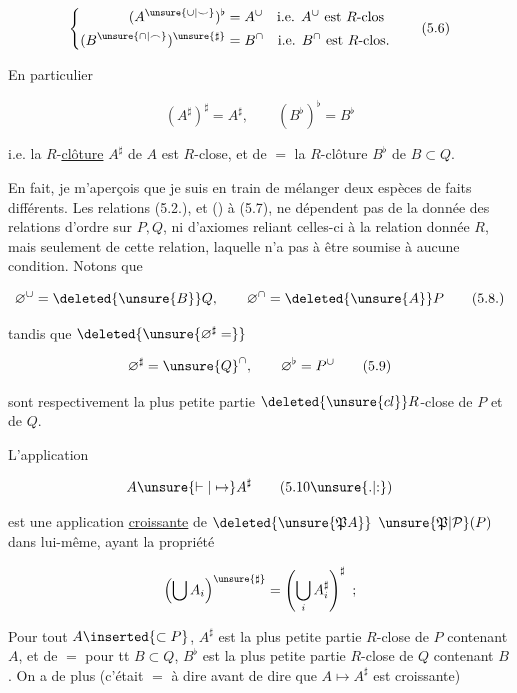 \[
\left\{\begin{aligned}
 (A^{\unsure{\cup|\smile}})^\flat&=A^\cup\quad\text{i.e. }A^\cup\text{ est }R\text{-clos}\\
 (B^{\unsure{\cap|\frown}})^{\unsure{\sharp}}&=B^\cap\quad\text{i.e. }B^\cap\text{ est }R\text{-clos.}
\end{aligned}\right.
\tag*{(5.6)}
\]

En particulier

\[
 (A^\sharp)^\sharp=A^\sharp,\qquad (B^\flat)^\flat=B^\flat
\tag*{(5.7.)}
\]

i.e. la $R$-\uline{clôture} $A^\sharp$ de $A$  est $R$-close, et de $=$ la $R$-clôture $B^\flat$ de $B\subset Q$.

En fait, je m'aperçois que je suis en train de mélanger deux espèces de faits différents.  Les relations (5.2.), et () à (5.7), ne dépendent pas de la donnée des relations d'ordre sur $P,Q$, ni d'axiomes reliant celles-ci à la relation donnée $R$, mais seulement de cette relation, laquelle n'a pas à être soumise à aucune condition. Notons que

\[
 \varnothing^\cup=\deleted{\unsure{B}}Q,\qquad \varnothing^\cap=\deleted{\unsure{A}}P
 \tag*{(5.8.)}
\]

tandis que $\deleted{\unsure{\varnothing^\sharp=}}$

\[
 \varnothing^\sharp=\unsure{Q}^\cap,\qquad \varnothing^\flat=P^\cup
 \tag*{(5.9)}
\]

sont respectivement la plus petite partie $\deleted{\unsure{cl}}R$-close de $P$ et de $Q$.

L'application

\[
 A\unsure{\vdash|\mapsto} A^\sharp
 \tag*{(5.10\unsure{.|:})}
\]

est une application \uline{croissante}  de $\deleted{\unsure{\mathfrak P A}}$  $\unsure{\mathfrak P|\mathcal P}(P)$ dans lui-même, ayant  la propriété

\deleted{\[
 \unsure{(A\subset B)^\sharp=A}
\]}

\[
 \left(\bigcup A_i\right)^{\unsure{\sharp}}=\left(\bigcup_i A_i^\sharp\right)^\sharp\ ;
\]

Pour tout $A\inserted{\subset P}$, $A^\sharp$ est la plus petite partie $R$-close de $P$ contenant $A$, et de $=$ pour tt $B\subset Q$, $B^\flat$ est la plus petite partie $R$-close de $Q$ contenant $B$. On a de plus (c'était $=$ à dire avant de dire que $A\mapsto A^\sharp$ est croissante)

